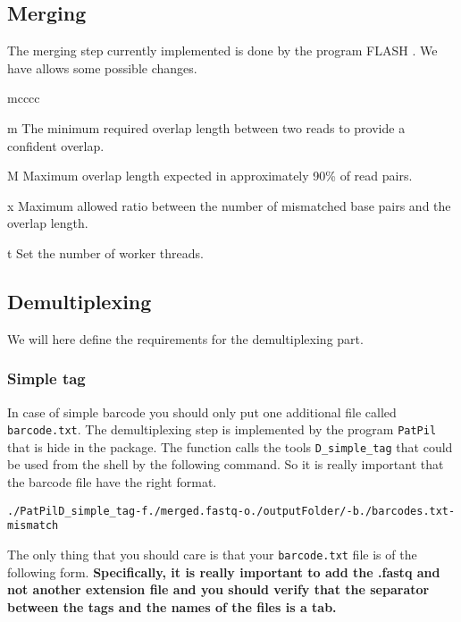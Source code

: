 \documentclass{article}\usepackage[]{graphicx}\usepackage[]{color}
\makeatletter
\newenvironment{kframe}{%
 \def\at@end@of@kframe{}%
 \ifinner\ifhmode%
  \def\at@end@of@kframe{\end{minipage}}%
  \begin{minipage}{\columnwidth}%
 \fi\fi%
 \def\FrameCommand##1{\hskip\@totalleftmargin \hskip-\fboxsep
 \colorbox{shadecolor}{##1}\hskip-\fboxsep
     \hskip-\linewidth \hskip-\@totalleftmargin \hskip\columnwidth}%
 \MakeFramed {\advance\hsize-\width
   \@totalleftmargin\z@ \linewidth\hsize
   \@setminipage}}%
 {\par\unskip\endMakeFramed%
 \at@end@of@kframe}
\newenvironment{knitrout}{}{} %
\makeatother
\begin{document}
\subsection{Merging}
\label{subsec:merge}

The merging step currently implemented is done by the program FLASH \cite{Magoc2011}. We have allows some possible changes.

\begin{labeling}{mcccc}
\item [m] The minimum required overlap length between two reads to provide a confident overlap.
\item [M] Maximum overlap length expected in approximately 90\% of read pairs.
\item [x] Maximum allowed ratio between the number of mismatched base pairs and the overlap length.
\item [t] Set the number of worker threads.
\end{labeling}

\subsection{Demultiplexing}
\label{subsec:demux}
We will here define the requirements for the demultiplexing part.

\subsubsection{Simple tag}
 In case of simple barcode you should only put one additional file called \texttt{barcode.txt}. The demultiplexing step is implemented by the program \texttt{PatPil} that is hide in the package. The function calls the tools \texttt{D\_simple\_tag} that could be used from the shell by the following command. So it is really important that the barcode file have the right format.

\begin{knitrout}\footnotesize
{}\color{fgcolor}\begin{kframe}
\begin{alltt}
./PatPil D_simple_tag -f ./merged.fastq -o ./outputFolder/ -b ./barcodes.txt -mismatch
\end{alltt}
\end{kframe}
\end{knitrout}

The only thing that you should care is that your \texttt{barcode.txt} file is of the following form. \textbf{Specifically, it is really important to add the .fastq and not another extension file and you should verify that the separator between the tags and the names of the files is a tab.}
\end{document}
